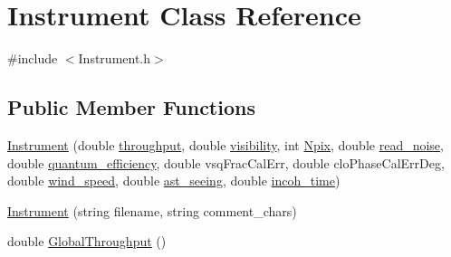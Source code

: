 \hypertarget{classInstrument}{
\section{Instrument Class Reference}
\label{classInstrument}
}


{\ttfamily \#include $<$Instrument.h$>$}

\subsection*{Public Member Functions}
\begin{DoxyCompactItemize}
\item 
\hyperlink{classInstrument_af68972d40961b639787c594e3d62857e}{Instrument} (double \hyperlink{classInstrument_a24c5a78025ce2474443eb34b8828df08}{throughput}, double \hyperlink{classInstrument_a8a79a07bd650ab75118beff9f46886a6}{visibility}, int \hyperlink{classInstrument_a349e2122c222f16ed712b5fb8660adb4}{Npix}, double \hyperlink{classInstrument_accb5f463e89c0c73d4c0e5b6b80397af}{read\_\-noise}, double \hyperlink{classInstrument_af352575aa1a6bb255db663a53fbb2b8b}{quantum\_\-efficiency}, double vsqFracCalErr, double cloPhaseCalErrDeg, double \hyperlink{classInstrument_a7e18ced4e4e556e5203c046c2ebb3c63}{wind\_\-speed}, double \hyperlink{classInstrument_a508dcac890549428696372a66ed5d3bc}{ast\_\-seeing}, double \hyperlink{classInstrument_ab431265cc3192bfcc9ceeafd1d30605b}{incoh\_\-time})
\item 
\hyperlink{classInstrument_a44911c880ba30eaf211f3905fc7ae7b5}{Instrument} (string filename, string comment\_\-chars)
\item 
double \hyperlink{classInstrument_aa43fea34962ffe530cc5cfb0dbaa67c2}{GlobalThroughput} ()
\end{DoxyCompactItemize}
